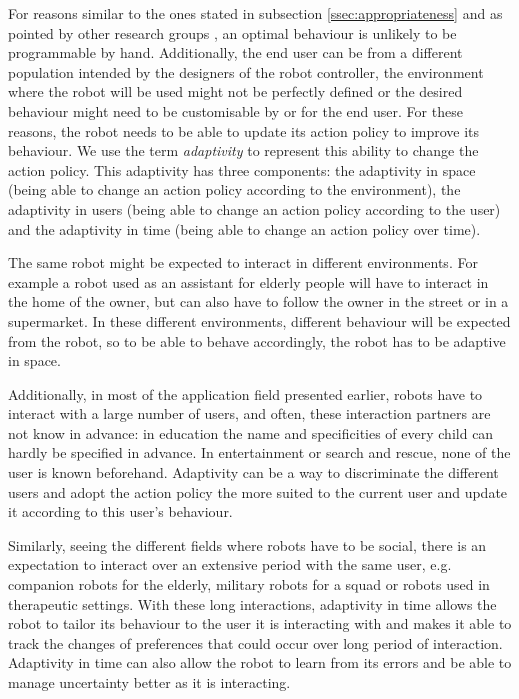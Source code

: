     For reasons similar to the ones stated in subsection
    \ref{ssec:appropriateness} and as pointed by other research groups
    \citep{argall2009survey, hoffman2016openwoz}, an optimal behaviour is
    unlikely to be programmable by hand. Additionally, the end user can be from
    a different population intended by the designers of the robot controller,
    the environment where the robot will be used might not be perfectly defined
    or the desired behaviour might need to be customisable by or for the end
    user. For these reasons, the  robot needs to be able to update its action
    policy to improve its behaviour. We use the term \emph{adaptivity} to
    represent this ability to change the action policy. This adaptivity has
    three components: the adaptivity in space (being able to change an action
    policy according to the environment), the adaptivity in users (being able to
    change an action policy according to the user) and the adaptivity in time
    (being able to change an action policy over time). 

    The same robot might be expected to interact in different environments. For
    example a robot used as an assistant for elderly people will have to
    interact in the home of the owner, but can also have to follow the owner in
    the street or in a supermarket. In these different environments, different
    behaviour will be expected from the robot, so to be able to behave
    accordingly, the robot has to be adaptive in space.

    Additionally, in most of the application field presented earlier, robots
    have to interact with a large number of users, and often, these interaction
    partners are not know in advance: in education the name and specificities of
    every child can hardly be specified in advance. In entertainment or search
    and rescue, none of the user is known beforehand. Adaptivity can be a way to
    discriminate the different users and adopt the action policy the more suited
    to the current user and update it according to this user's behaviour.

    Similarly, seeing the different fields where robots have to be social, there
    is an expectation to interact over an extensive period with the same user,
    e.g. companion robots for the elderly, military robots for a squad or robots
    used in therapeutic settings. With these long interactions, adaptivity in
    time allows the robot to tailor its behaviour to the user it is interacting
    with and makes it able to track the changes of preferences that could occur
    over long period of interaction. Adaptivity in time can also allow the robot
    to learn from its errors and be able to manage uncertainty better as it is
    interacting.

